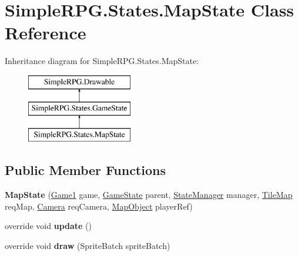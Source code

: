 \hypertarget{class_simple_r_p_g_1_1_states_1_1_map_state}{\section{Simple\+R\+P\+G.\+States.\+Map\+State Class Reference}
\label{class_simple_r_p_g_1_1_states_1_1_map_state}
}
Inheritance diagram for Simple\+R\+P\+G.\+States.\+Map\+State\+:\begin{figure}[H]
\begin{center}
\leavevmode
\includegraphics[height=3.000000cm]{class_simple_r_p_g_1_1_states_1_1_map_state}
\end{center}
\end{figure}
\subsection*{Public Member Functions}
\begin{DoxyCompactItemize}
\item 
\hypertarget{class_simple_r_p_g_1_1_states_1_1_map_state_a50fdccce55137f029299c1f503bc7036}{{\bfseries Map\+State} (\hyperlink{class_simple_r_p_g_1_1_game1}{Game1} game, \hyperlink{class_simple_r_p_g_1_1_states_1_1_game_state}{Game\+State} parent, \hyperlink{class_simple_r_p_g_1_1_states_1_1_state_manager}{State\+Manager} manager, \hyperlink{class_simple_r_p_g_1_1_tile_map}{Tile\+Map} req\+Map, \hyperlink{class_simple_r_p_g_1_1_camera}{Camera} req\+Camera, \hyperlink{class_simple_r_p_g_1_1_map_object}{Map\+Object} player\+Ref)}\label{class_simple_r_p_g_1_1_states_1_1_map_state_a50fdccce55137f029299c1f503bc7036}

\item 
\hypertarget{class_simple_r_p_g_1_1_states_1_1_map_state_a33046184ea7cbf635fa2523705c1b2fb}{override void {\bfseries update} ()}\label{class_simple_r_p_g_1_1_states_1_1_map_state_a33046184ea7cbf635fa2523705c1b2fb}

\item 
\hypertarget{class_simple_r_p_g_1_1_states_1_1_map_state_ad50aff095077e679434d708abb11e716}{override void {\bfseries draw} (Sprite\+Batch sprite\+Batch)}\label{class_simple_r_p_g_1_1_states_1_1_map_state_ad50aff095077e679434d708abb11e716}

\end{DoxyCompactItemize}
